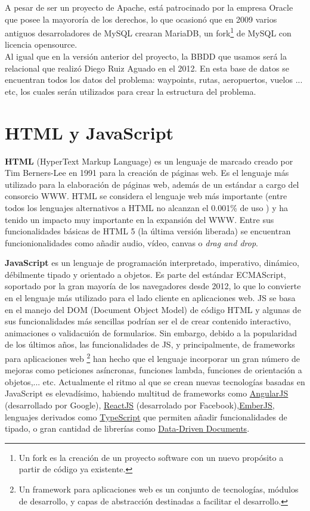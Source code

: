 A pesar de ser un proyecto de Apache, está patrocinado por la empresa Oracle que posee la mayororía de los derechos, lo que ocasionó que en 2009 varios antiguos desarroladores de MySQL crearan MariaDB, un fork\footnote{Un fork es la creación de un proyecto software con un nuevo propósito a partir de código ya existente.} de MySQL con licencia opensource.\\

Al igual que en la versión anterior del proyecto, la BBDD que usamos será la relacional que realizó Diego Ruiz Aguado en el 2012. En esta base de datos se encuentran todos los datos del problema: waypoints, rutas, aeropuertos, vuelos ... etc, los cuales serán utilizados para crear la estructura del problema.


\section{HTML y JavaScript}
\textbf{HTML} (HyperText Markup Language) es un lenguaje de marcado creado por Tim Berners-Lee en 1991 para la creación de páginas web. Es el lenguaje más utilizado para la elaboración de páginas web, además de un estándar a cargo del consorcio WWW.
HTML se considera el lenguaje web más importante (entre todos los lenguajes alternativos a HTML no alcanzan el 0.001\% de uso ) y ha tenido un impacto muy importante en la expansión del WWW. Entre sus funcionalidades básicas de HTML 5 (la última versión liberada) se encuentran funcionionalidades como añadir audio, vídeo, canvas o \textit{drag and drop}.

\textbf{JavaScript} es un lenguaje de programación interpretado, imperativo, dinámico, débilmente tipado y  orientado a objetos. Es parte del estándar ECMAScript, soportado por la gran mayoría de los navegadores desde 2012, lo que lo convierte en el lenguaje más utilizado para el lado cliente en aplicaciones web. 
JS se basa en el manejo del DOM (Document Object Model) de código HTML y algunas de sus funcionalidades más sencillas podrían ser el de crear contenido interactivo, animaciones o validacuión de formularios. Sin embargo, debido a la popularidad de los últimos años, las funcionalidades de JS, y principalmente, de frameworks para aplicaciones web \footnote{Un framework para aplicaciones web es un conjunto de tecnologías, módulos de desarrollo, y capas de abstracción destinadas a facilitar el desarrollo.} han hecho que el lenguaje incorporar un gran número de mejoras como peticiones asíncronas, funciones lambda, funciones de orientación a objetos,... etc.
Actualmente el ritmo al que se crean nuevas tecnologías basadas en JavaScript es elevadísimo, habiendo multitud de frameworks como \href{https://angularjs.org/}{AngularJS} (desarrollado por Google), \href{https://facebook.github.io/react/}{ReactJS} (desarrolado por Facebook),\href{https://www.emberjs.com/}{EmberJS}, lenguajes derivados como \href{https://www.typescriptlang.org/}{TypeScript} que permiten añadir funcionalidades de tipado, o gran cantidad de librerías como \href{https://d3js.org/}{Data-Driven Documents}.\\

